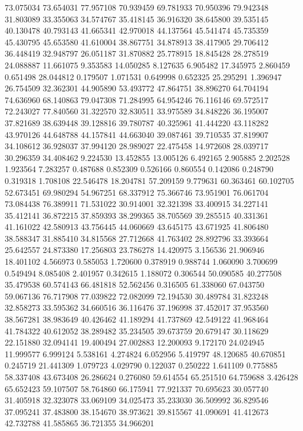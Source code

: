73.075034
73.654031
77.957108
70.939459
69.781933
70.950396
79.942348
31.803089
33.355063
34.574767
35.418145
36.916320
38.645800
39.535145
40.130478
40.793143
41.665341
42.970018
44.137564
45.541474
45.735359
45.430795
45.653580
41.610004
38.867751
34.878913
38.417905
29.706412
36.448419
32.948797
26.051187
31.870882
25.778915
18.845428
28.278519
24.088887
11.661075
9.353583
14.050285
8.127635
6.905482
17.345975
2.860459
0.651498
28.044812
0.179507
1.071531
0.649998
0.652325
25.295291
1.396947
26.754509
32.362301
44.905890
53.493772
47.864751
38.896270
64.704194
74.636960
68.140863
79.047308
71.284995
64.954246
76.116146
69.572517
72.243027
77.840560
31.322570
32.830511
33.975589
34.848226
36.195007
37.821689
38.639448
39.128816
39.780787
40.325961
41.444220
43.118282
43.970126
44.648788
44.157841
44.663040
39.087461
39.710535
37.819907
34.108612
36.928037
37.994120
28.989027
22.475458
14.972608
28.039717
30.296359
34.408462
9.224530
13.452855
13.005126
6.492165
2.905885
2.202528
1.923564
7.283257
0.487688
0.852309
0.526166
0.860554
0.142086
0.248790
0.319318
1.708108
22.546478
18.204781
57.209159
9.779631
60.363461
60.102705
52.673451
69.980294
54.967251
68.337912
75.366746
73.951901
76.061704
73.084438
76.389911
71.531022
30.914001
32.321398
33.400915
34.227141
35.412141
36.872215
37.859393
38.299365
38.705569
39.285515
40.331361
41.161022
42.580913
43.756445
44.060669
43.645175
43.671925
41.806480
38.588347
31.885410
34.815568
27.712668
41.763402
28.892796
33.393664
25.642557
24.873380
17.256803
23.786278
14.420975
3.156536
21.906946
18.401102
4.566973
0.585053
1.720600
0.378919
0.988744
1.060090
3.700699
0.549494
8.085408
2.401957
0.342615
1.188072
0.306544
50.090585
40.277508
35.479538
60.574143
66.481818
52.562456
0.316505
61.338060
67.043750
59.067136
76.717908
77.039822
72.082099
72.194530
30.489784
31.823248
32.858273
33.595362
34.660516
36.116476
37.196998
37.452017
37.953560
38.567281
38.983649
40.426462
41.189294
41.737869
42.549122
41.968464
41.784322
40.612052
38.289482
35.234505
39.673759
20.679147
30.118629
22.151880
32.094141
19.400494
27.002883
12.200093
9.172170
24.024945
11.999577
6.999124
5.538161
4.274824
6.052956
5.419797
48.120685
40.670851
0.245719
21.441309
1.079723
4.029790
0.122037
0.250222
1.641109
0.775885
58.337408
43.673408
26.286624
0.276080
59.614554
65.251510
64.759688
3.426428
65.652423
59.107507
58.764860
66.175941
77.921337
70.695623
30.057740
31.405918
32.323078
33.069109
34.025473
35.233030
36.509992
36.829546
37.095241
37.483800
38.154670
38.973621
39.815567
41.090691
41.412673
42.732788
41.585865
36.721355
34.966201
